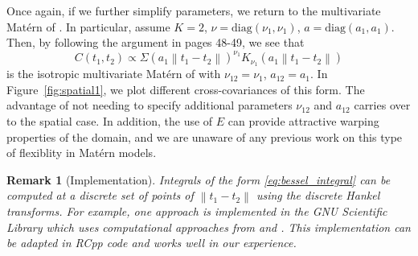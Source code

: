 \documentclass[11pt]{article}
\newtheorem*{remark}{Remark}
\begin{document}
Once again, if we further simplify parameters, we return to the multivariate Mat\'ern of \cite{gneiting_matern_2010}. In particular, assume $K = 2$, $\nu = \textrm{diag}(\nu_1, \nu_1)$, $a = \textrm{diag}(a_1, a_1)$. Then, by following the argument in \cite{stein_interpolation_2013} pages 48-49, we see that $$C(t_1, t_2) \propto \Sigma(a_1\left\lVert t_1 - t_2\right\rVert)^{\nu_1}K_{\nu_1}(a_1 \left\lVert t_1 - t_2 \right\rVert)$$is the isotropic multivariate Mat\'ern of \cite{gneiting_matern_2010} with $\nu_{12} = \nu_1$, $a_{12} = a_1$. In Figure~\ref{fig:spatial1}, we plot different cross-covariances of this form. The advantage of not needing to specify additional parameters $\nu_{12}$ and $a_{12}$ carries over to the spatial case. In addition, the use of $E$ can provide attractive warping properties of the domain, and we are unaware of any previous work on this type of flexiblity in Mat\'ern models.

\begin{remark}[Implementation]
Integrals of the form \eqref{eq:bessel_integral} can be computed at a discrete set of points of $\left\lVert t_1 - t_2 \right\rVert$ using the discrete Hankel transforms. For example, one approach is implemented in the GNU Scientific Library \citep{galassi_gnu_2009} which uses computational approaches from \cite{johnson_improved_1987} and \cite{lemoine_discrete_1994}. This implementation can be adapted in RCpp code and works well in our experience.
\end{remark}

\end{document}
